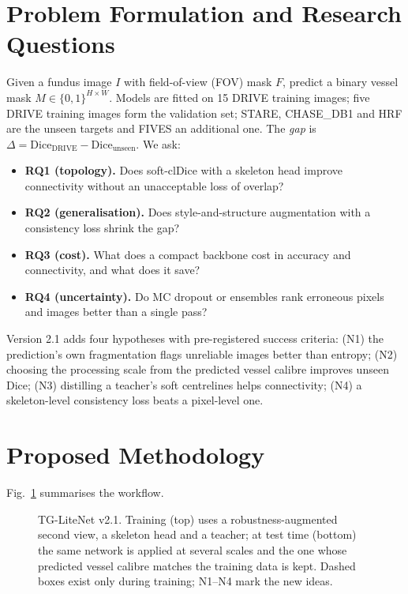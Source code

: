 \documentclass[conference]{IEEEtran}
\begin{document}
\section{Problem Formulation and Research Questions}
Given a fundus image $I$ with field-of-view (FOV) mask $F$, predict a binary vessel mask $M\in\{0,1\}^{H\times W}$. Models are fitted on 15 DRIVE training images; five DRIVE training images form the validation set; STARE, CHASE\_DB1 and HRF are the unseen targets and FIVES an additional one. The \emph{gap} is $\Delta=\mathrm{Dice}_{\mathrm{DRIVE}}-\mathrm{Dice}_{\mathrm{unseen}}$. We ask:
\begin{itemize}\setlength\itemsep{0pt}
\item \textbf{RQ1 (topology).} Does soft-clDice with a skeleton head improve connectivity without an unacceptable loss of overlap?
\item \textbf{RQ2 (generalisation).} Does style-and-structure augmentation with a consistency loss shrink the gap?
\item \textbf{RQ3 (cost).} What does a compact backbone cost in accuracy and connectivity, and what does it save?
\item \textbf{RQ4 (uncertainty).} Do MC dropout or ensembles rank erroneous pixels and images better than a single pass?
\end{itemize}
Version 2.1 adds four hypotheses with pre-registered success criteria: (N1) the prediction's own fragmentation flags unreliable images better than entropy; (N2) choosing the processing scale from the predicted vessel calibre improves unseen Dice; (N3) distilling a teacher's soft centrelines helps connectivity; (N4) a skeleton-level consistency loss beats a pixel-level one.

\section{Proposed Methodology}
Fig.~\ref{fig:overview} summarises the workflow.

\begin{figure}[t]
\centering
\resizebox{0.92\textwidth}{!}{}
\caption{TG-LiteNet v2.1. Training (top) uses a robustness-augmented second view, a skeleton head and a teacher; at test time (bottom) the same network is applied at several scales and the one whose predicted vessel calibre matches the training data is kept. Dashed boxes exist only during training; N1--N4 mark the new ideas.}
\label{fig:overview}
\end{figure}
\end{document}
